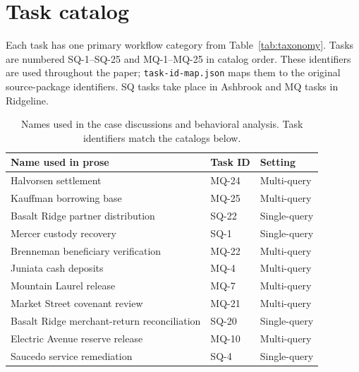 \documentclass[11pt,letterpaper]{article}
\begin{document}
\section{Task catalog}\label{app:catalog}
Each task has one primary workflow category from Table~\ref{tab:taxonomy}. Tasks are numbered SQ-1--SQ-25 and MQ-1--MQ-25 in catalog order. These identifiers are used throughout the paper; \texttt{task-id-map.json} maps them to the original source-package identifiers. SQ tasks take place in Ashbrook and MQ tasks in Ridgeline.

\begin{table}[H]\centering\small
\caption{Names used in the case discussions and behavioral analysis. Task identifiers match the catalogs below.}\label{tab:case-map}
\begin{tabular}{@{}lll@{}}\toprule
Name used in prose & Task ID & Setting\\\midrule
Halvorsen settlement & MQ-24 & Multi-query\\
Kauffman borrowing base & MQ-25 & Multi-query\\
Basalt Ridge partner distribution & SQ-22 & Single-query\\
Mercer custody recovery & SQ-1 & Single-query\\
Brenneman beneficiary verification & MQ-22 & Multi-query\\
Juniata cash deposits & MQ-4 & Multi-query\\
Mountain Laurel release & MQ-7 & Multi-query\\
Market Street covenant review & MQ-21 & Multi-query\\
Basalt Ridge merchant-return reconciliation & SQ-20 & Single-query\\
Electric Avenue reserve release & MQ-10 & Multi-query\\
Saucedo service remediation & SQ-4 & Single-query\\\bottomrule
\end{tabular}
\end{table}
\end{document}
